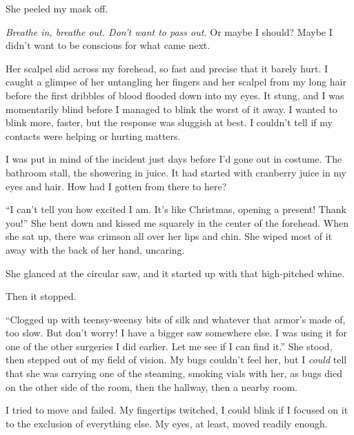 She peeled my mask off.



\emph{Breathe in, breathe out.  Don't want to pass out.  }Or maybe I should?  Maybe I didn't want to be conscious for what came next.



Her scalpel slid across my forehead, so fast and precise that it barely hurt.  I caught a glimpse of her untangling her fingers and her scalpel from my long hair before the first dribbles of blood flooded down into my eyes.  It stung, and I was momentarily blind before I managed to blink the worst of it away.  I wanted to blink more, faster, but the response was sluggish at best.  I couldn't tell if my contacts were helping or hurting matters.



I was put in mind of the incident just days before I'd gone out in costume.  The bathroom stall, the showering in juice.  It had started with cranberry juice in my eyes and hair.  How had I gotten from there to here?



``I can't tell you how excited I am.  It's like Christmas, opening a present!  Thank you!''  She bent down and kissed me squarely in the center of the forehead.  When she sat up, there was crimson all over her lips and chin.  She wiped most of it away with the back of her hand, uncaring.



She glanced at the circular saw, and it started up with that high-pitched whine.



Then it stopped.



``Clogged up with teensy-weensy bits of silk and whatever that armor's made of, too slow.  But don't worry!  I have a bigger saw somewhere else.  I was using it for one of the other surgeries I did earlier.  Let me see if I can find it.''  She stood, then stepped out of my field of vision.  My bugs couldn't feel her, but I \emph{could} tell that she was carrying one of the steaming, smoking vials with her, as bugs died on the other side of the room, then the hallway, then a nearby room.



I tried to move and failed.  My fingertips twitched, I could blink if I focused on it to the exclusion of everything else.  My eyes, at least, moved readily enough.



